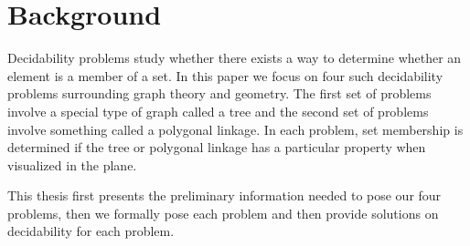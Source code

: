 \chapter{Background}

Decidability problems study whether there exists a way to determine whether an element is a member of a set.  
In this paper we focus on four such decidability problems surrounding graph theory and geometry. 
The first set of problems involve a special type of graph called a tree and the second set of problems involve something called a polygonal linkage.  
In each problem, set membership is determined if the tree or polygonal linkage has a particular property when visualized in the plane. 

This thesis first presents the preliminary information needed to pose our four problems, then we formally pose each problem and then provide solutions on decidability for each problem. 